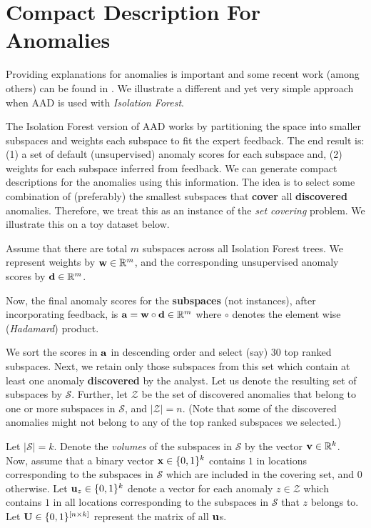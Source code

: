 \documentclass{article} %
\begin{document}
\section{Compact Description For Anomalies}

Providing explanations for anomalies is important and some recent work (among others) can be found in \cite{macha:2017}. We illustrate a different and yet very simple approach when AAD is used with \textit{Isolation Forest}.

The Isolation Forest version of AAD works by partitioning the space into smaller subspaces and weights each subspace to fit the expert feedback. The end result is: (1) a set of default (unsupervised) anomaly scores for each subspace and, (2) weights for each subspace inferred from feedback. We can generate compact descriptions for the anomalies using this information. The idea is to select some combination of (preferably) the smallest subspaces that \textbf{cover} all \textbf{discovered} anomalies. Therefore, we treat this as an instance of the \emph{set covering} problem. We illustrate this on a toy dataset below.

Assume that there are total $m$ subspaces across all Isolation Forest trees. We represent weights by ${\bf w} \in \mathbb{R}^m$, and the corresponding unsupervised anomaly scores by ${\bf d} \in \mathbb{R}^m$.

Now, the final anomaly scores for the \textbf{subspaces} (not instances), after incorporating feedback, is ${\bf a} = {\bf w} \circ {\bf d} \in \mathbb{R}^m$ where $\circ$ denotes the element wise (\textit{Hadamard}) product.

We sort the scores in ${\bf a}$ in descending order and select (say) $30$ top ranked subspaces. Next, we retain only those subspaces from this set which contain at least one anomaly \textbf{discovered} by the analyst. Let us denote the resulting set of subspaces by $\mathcal{S}$. Further, let $\mathcal{Z}$ be the set of discovered anomalies that belong to one or more subspaces in $\mathcal{S}$, and $|\mathcal{Z}|=n$. (Note that some of the discovered anomalies might not belong to any of the top ranked subspaces we selected.)

Let $|\mathcal{S}|=k$. Denote the \textit{volumes} of the subspaces in $\mathcal{S}$ by the vector ${\bf v} \in \mathbb{R}^k$. Now, assume that a binary vector ${\bf x} \in \{0, 1\}^k$ contains $1$ in locations corresponding to the subspaces in $\mathcal{S}$ which are included in the covering set, and $0$ otherwise. Let ${\bf u}_z \in \{0, 1\}^k$ denote a vector for each anomaly $z \in \mathcal{Z}$ which contains $1$ in all locations corresponding to the subspaces in $\mathcal{S}$ that $z$ belongs to. Let ${\bf U} \in \{0, 1\}^{[n \times k]}$ represent the matrix of all ${\bf u}$s.
\end{document}
